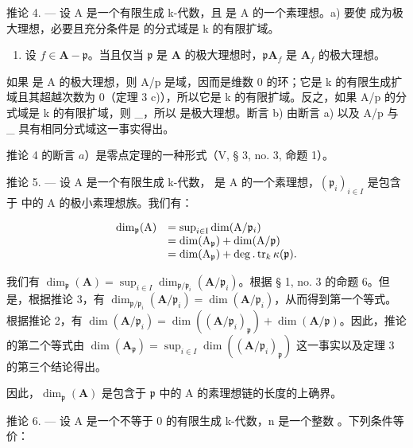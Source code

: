 推论 4. --- 设 A 是一个有限生成 k-代数，且  是 A 的一个素理想。a) 要使  成为极大理想，必要且充分条件是  的分式域是 k 的有限扩域。

\begin{enumerate}
\def\labelenumi{\alph{enumi})}
\setcounter{enumi}{1}
\tightlist
\item
  设 \(f \in \mathbf{A} - \mathfrak{p}\)。当且仅当 \(\mathfrak{p}\) 是 \(\mathbf{A}\) 的极大理想时，\(\mathfrak{p}\mathbf{A}_f\) 是 \(\mathbf{A}_f\) 的极大理想。
\end{enumerate}

如果  是 A 的极大理想，则 A/p 是域，因而是维数 0 的环；它是 k 的有限生成扩域且其超越次数为 0（定理 3 c)），所以它是 k 的有限扩域。反之，如果 A/p 的分式域是 k 的有限扩域，则 \_，所以  是极大理想。断言 b) 由断言 a) 以及 A/p 与 \_ 具有相同分式域这一事实得出。

推论 4 的断言 \(a\)）是零点定理的一种形式（V, § 3, no. 3, 命题 1）。

推论 5. --- 设 A 是一个有限生成 k-代数，  是 A 的一个素理想，\((\mathfrak{p}_{i})_{i\in I}\) 是包含于  中的 A 的极小素理想族。我们有：

\[
\begin{array}{r l} \dim_ {\mathfrak {p}} (\mathrm{A}) & = \sup _ {i \in \mathrm{I}} \dim (\mathrm{A} / \mathfrak {p} _ {i}) \\ & = \dim (\mathrm{A} _ {\mathfrak {p}}) + \dim (\mathrm{A} / \mathfrak {p}) \\ & = \dim (\mathrm{A} _ {\mathfrak {p}}) + \deg . \operatorname{tr} _ {k} \kappa (\mathfrak {p}). \end{array}
\]

我们有 \(\dim_{\mathfrak{p}}(\mathbf{A}) = \sup_{i\in I}\dim_{\mathfrak{p} / \mathfrak{p}_i}(\mathbf{A} / \mathfrak{p}_i)\)。根据 § 1, no. 3 的命题 6。但是，根据推论 3，有 \(\dim_{\mathfrak{p} / \mathfrak{p}_i}(\mathbf{A} / \mathfrak{p}_i) = \dim (\mathbf{A} / \mathfrak{p}_i)\)，从而得到第一个等式。根据推论 2，有 \(\dim (\mathbf{A} / \mathfrak{p}_i) = \dim ((\mathbf{A} / \mathfrak{p}_i)_{\mathfrak{p}}) + \dim (\mathbf{A} / \mathfrak{p})\)。因此，推论的第二个等式由 \(\dim (\mathbf{A}_{\mathfrak{p}}) = \sup_{i\in I}\dim ((\mathbf{A} / \mathfrak{p}_i)_{\mathfrak{p}})\) 这一事实以及定理 3 的第三个结论得出。

因此，\(\dim_{\mathfrak{p}}(\mathbf{A})\) 是包含于 \(\mathfrak{p}\) 中的 A 的素理想链的长度的上确界。

推论 6. --- 设 A 是一个不等于 0 的有限生成 k-代数，n 是一个整数 。下列条件等价：

